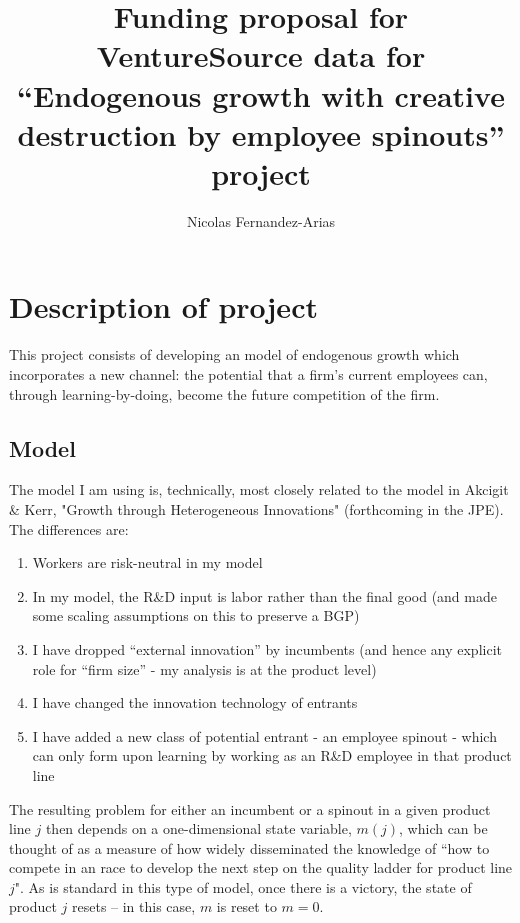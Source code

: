 \documentclass[12pt,english]{article}
\theoremstyle{remark}
\begin{document}
	
\title{Funding proposal for VentureSource data for ``Endogenous growth with creative destruction by employee spinouts'' project}
\author{Nicolas Fernandez-Arias}
\maketitle

\section{Description of project}

This project consists of developing an model of endogenous growth which incorporates a new channel: the potential that a firm's current employees can, through learning-by-doing, become the future competition of the firm. 

\subsection{Model}

The model I am using is, technically, most closely related to the model in Akcigit \& Kerr, "Growth through Heterogeneous Innovations" (forthcoming in the JPE). The differences are:
\begin{enumerate}
	\item Workers are risk-neutral in my model
	\item In my model, the R\&D input is labor rather than the final good (and made some scaling assumptions on this to preserve a BGP)
	\item I have dropped ``external innovation'' by incumbents (and hence any explicit role for ``firm size'' - my analysis is at the product level)
	\item I have changed the innovation technology of entrants
	\item I have added a new class of potential entrant - an employee spinout - which can only form upon learning by working as an R\&D employee in that product line
\end{enumerate}

The resulting problem for either an incumbent or a spinout in a given product line $j$ then depends on a one-dimensional state variable, $m(j)$, which can be thought of as a measure of how widely disseminated the knowledge of ``how to compete in an race to develop the next step on the quality ladder for product line $j$". As is standard in this type of model, once there is a victory, the state of product $j$ resets -- in this case, $m$ is reset to $m = 0$. 
\end{document}
